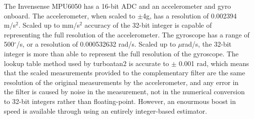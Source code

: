 \documentclass[paper=a4, fontsize=11pt]{scrartcl} %
\numberwithin{equation}{section} %
\numberwithin{figure}{section} %
\numberwithin{table}{section} %
\begin{document}
The Invensense MPU6050 has a 16-bit ADC and an accelerometer and gyro onboard.  The accelerometer, when scaled to $\pm$4g, has a resolution of 0.002394 m/s$^2$.  Scaled up to mm/s$^2$ accuracy of the 32-bit integer is capable of representing the full resolution of the accelerometer.  The gyroscope has a range of 500$^\circ$/s, or a resolution of 0.000532632 rad/s.  Scaled up to $\mu$rad/s, the 32-bit integer is more than able to represent the full resolution of the gyroscope.  The lookup table method used by turboatan2 is accurate to $\pm$ 0.001 rad, which means that the scaled measurements provided to the complementary filter are the same resolution of the original measurements by the accelerometer, and any error in the filter is caused by noise in the measurement, not in the numerical conversion to 32-bit integers rather than floating-point.  However, an enourmous boost in speed is available through using an entirely integer-based estimator.



\end{document}
